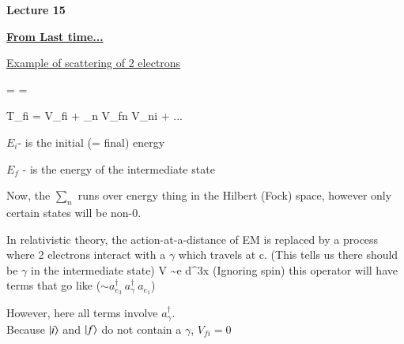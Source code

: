 
\usepackage{braket}
\usepackage{bbm}
\usepackage{relsize}
\usepackage{tcolorbox}



\usepackage{cancel}

\usepackage{fancyhdr}

\fancyhf{}


\thispagestyle{fancy}

\begin{center}
{\huge \textbf{Lecture 15}}
\end{center}

{\fontsize{14}{16}\selectfont

\textbf{\underline{From Last time...}} 

 
\underline{Example of scattering of 2 electrons}

\be
{} =  \hspace*{1in}   = 
\ee


\be
T_{fi} = V_{fi} + \sum_n V_{fn}  V_{ni} + ...
\ee

\bi
\item[-] $E_i$- is the initial (= final) energy
\item[-] $E_f$ - is the energy of the intermediate state
\ei

Now, the $\sum_n$ runs over energy thing in the Hilbert (Fock) space, however only certain states will be non-0.

In relativistic theory, the action-at-a-distance of EM is replaced by a process where 2 electrons interact with a $\gamma$ which travels at c. 
(This tells us there should be $\gamma$ in the intermediate state)
\be
V \sim e \int d^3x \psi \phi \psi  \hspace*{0.3in} \textrm{(Ignoring spin)}
\ee
this operator will have terms that go like ($\sim a_{e_3}^\dagger\ a_{\gamma}^\dagger\ a_{e_1}$)


However, here all terms involve $a_{\gamma}^\dagger$.\\
Because $\ket{i}$ and $\ket{f}$ do not contain a $\gamma$, $  V_{fi} = 0$

}
